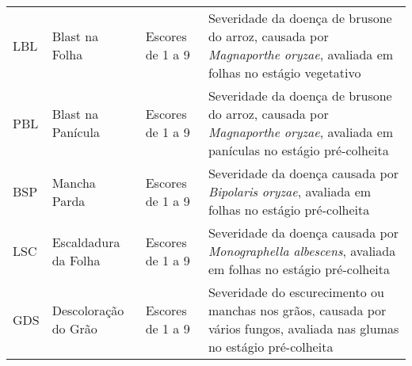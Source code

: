 \begin{longtable}{@{} p{2.5cm} p{2.5cm} p{2.5cm} p{8.5cm} @{}}
	LBL & Blast na Folha       & Escores de 1 a 9 & Severidade da doença de brusone do arroz, causada por \textit{Magnaporthe oryzae}, avaliada em folhas no estágio vegetativo       \\
	PBL & Blast na Panícula    & Escores de 1 a 9 & Severidade da doença de brusone do arroz, causada por \textit{Magnaporthe oryzae}, avaliada em panículas no estágio pré-colheita  \\
	BSP & Mancha Parda         & Escores de 1 a 9 & Severidade da doença causada por \textit{Bipolaris oryzae}, avaliada em folhas no estágio pré-colheita                            \\
	LSC & Escaldadura da Folha & Escores de 1 a 9 & Severidade da doença causada por \textit{Monographella albescens}, avaliada em folhas no estágio pré-colheita                     \\
	GDS & Descoloração do Grão & Escores de 1 a 9 & Severidade do escurecimento ou manchas nos grãos, causada por vários fungos, avaliada nas glumas no estágio pré-colheita \\* \bottomrule
\end{longtable}
